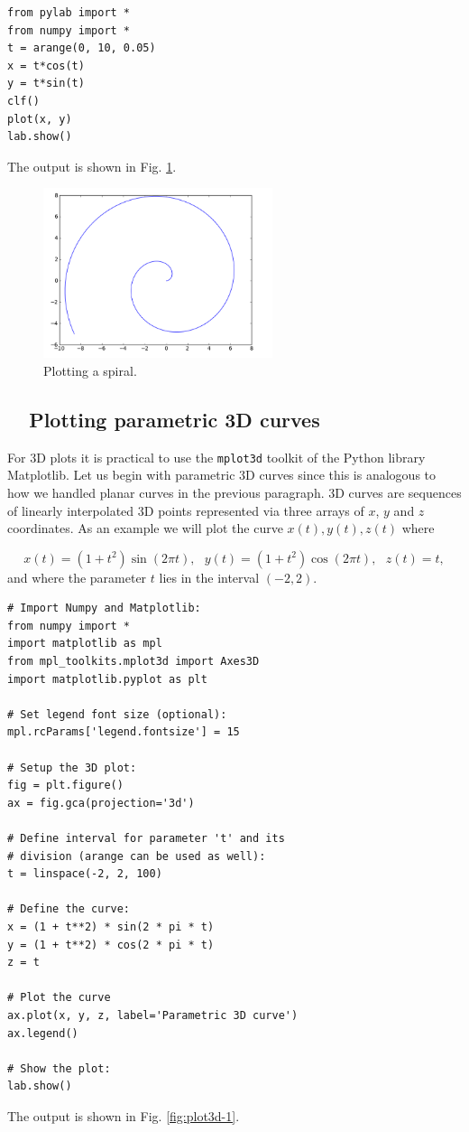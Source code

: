 \begin{verbatim}
from pylab import *
from numpy import *
t = arange(0, 10, 0.05)
x = t*cos(t)
y = t*sin(t)
clf()
plot(x, y)
lab.show()
\end{verbatim}
The output is shown in Fig. \ref{fig:plot6}.

\begin{figure}[!ht]
\begin{center}
\includegraphics[width=0.6\textwidth]{imgp/plot6.png}
\end{center}
\vspace{-6mm}
\caption{Plotting a spiral.}
\label{fig:plot6}
\vspace{-0mm}
\end{figure}
\noindent

\subsection{\ \ Plotting parametric 3D curves}

For 3D plots it is practical to use the {\tt mplot3d} toolkit of the 
Python library Matplotlib. Let us begin with 
parametric 3D curves since this is analogous to how we handled planar curves in 
the previous paragraph. 3D curves are sequences of linearly interpolated 3D points
represented via three arrays of $x$, $y$ and $z$ coordinates. As an 
example we will plot the curve $x(t), y(t), z(t)$ where

$$
x(t) = (1 + t^2) \sin(2 \pi t), \ \ \ y(t) = (1 + t^2) \cos(2 \pi t), \ \ \ z(t) = t,
$$
and where the parameter $t$ lies in the interval $(-2, 2)$.

\begin{verbatim}
# Import Numpy and Matplotlib:
from numpy import *
import matplotlib as mpl
from mpl_toolkits.mplot3d import Axes3D
import matplotlib.pyplot as plt

# Set legend font size (optional):
mpl.rcParams['legend.fontsize'] = 15

# Setup the 3D plot:
fig = plt.figure()
ax = fig.gca(projection='3d')

# Define interval for parameter 't' and its
# division (arange can be used as well):
t = linspace(-2, 2, 100)

# Define the curve:
x = (1 + t**2) * sin(2 * pi * t)
y = (1 + t**2) * cos(2 * pi * t)
z = t

# Plot the curve
ax.plot(x, y, z, label='Parametric 3D curve')
ax.legend()

# Show the plot:
lab.show()
\end{verbatim}
The output is shown in Fig. \ref{fig:plot3d-1}.


